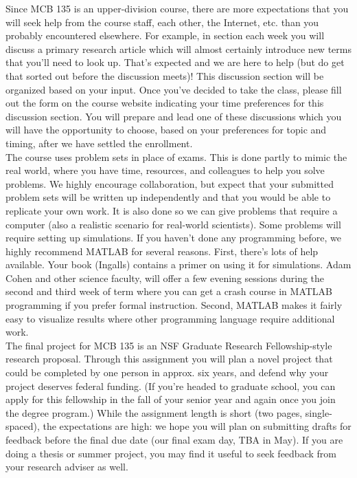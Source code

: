 \documentclass{article}
\begin{document}
Since MCB 135 is an upper-division course, there are more expectations that you will seek help from the course staff, each other, the Internet, etc. than you probably encountered elsewhere. For example, in section each week you will discuss a primary research article which will almost certainly introduce new terms that you'll need to look up. That's expected and we are here to help (but do get that sorted out before the discussion meets)! This discussion section will be organized based on your input. Once you've decided to take the class, please fill out the form on the course website indicating your time preferences for this discussion section. You will prepare and lead one of these discussions which you will have the opportunity to choose, based on your preferences for topic and timing, after we have settled the enrollment.\\

The course uses problem sets in place of exams. This is done partly to mimic the real world, where you have time, resources, and colleagues to help you solve problems. We highly encourage collaboration, but expect that your submitted problem sets will be written up independently and that you would be able to replicate your own work. It is also done so we can give problems that require a computer (also a realistic scenario for real-world scientists). Some problems will require setting up simulations. If you haven't done any programming before, we highly recommend MATLAB for several reasons. First, there's lots of help available. Your book (Ingalls) contains a primer on using it for simulations. Adam Cohen and other science faculty, will offer a few evening sessions during the second and third week of term where you can get a crash course in MATLAB programming if you prefer formal instruction. Second, MATLAB makes it fairly easy to visualize results where other programming language require additional work.\\

The final project for MCB 135 is an NSF Graduate Research Fellowship-style research proposal. Through this assignment you will plan a novel project that could be completed by one person in approx. six years, and defend why your project deserves federal funding. (If you're headed to graduate school, you can apply for this fellowship in the fall of your senior year and again once you join the degree program.) While the assignment length is short (two pages, single-spaced), the expectations are high: we hope you will plan on submitting drafts for feedback before the final due date (our final exam day, TBA in May). If you are doing a thesis or summer project, you may find it useful to seek feedback from your research adviser as well. 
\end{document}
